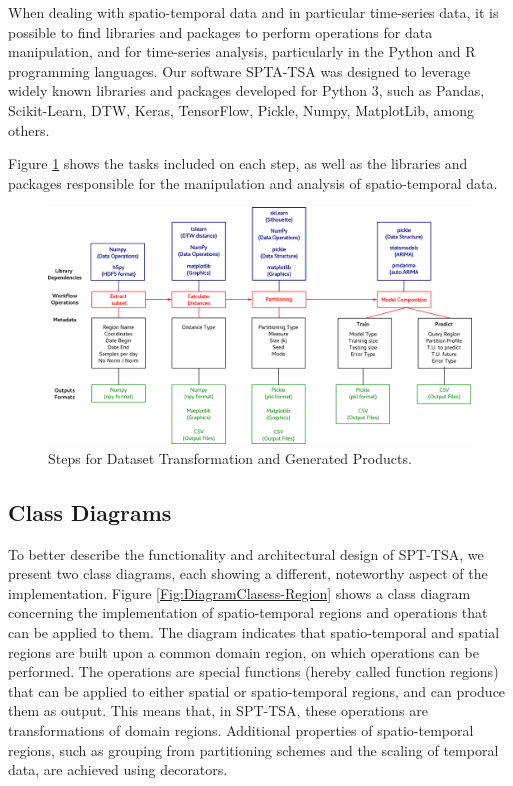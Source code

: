 When dealing with spatio-temporal data and in particular time-series data, it is possible to find libraries and packages to perform operations for data manipulation, and for time-series analysis, particularly in the Python and R programming languages. Our software SPTA-TSA was designed to leverage widely known libraries and packages developed for Python 3, such as Pandas, Scikit-Learn, DTW, Keras, TensorFlow, Pickle, Numpy, MatplotLib, among others.

Figure \ref{Fig:Steps-Data-Transformation} shows the tasks included on each step, as well as the libraries and packages responsible for the manipulation and analysis of spatio-temporal data.


\begin{figure}[tp]
	\centering
	\includegraphics[scale=0.25, angle=90]{../Figures/workflow_data_operations}
	\caption{Steps for Dataset Transformation and Generated Products.}	
	\label{Fig:Steps-Data-Transformation}	 		
\end{figure}


\subsection{Class Diagrams}
\label{Sec:SPT-TSAClassDiagrams}

To better describe the functionality and architectural design of SPT-TSA, we present two class diagrams, each showing a different, noteworthy aspect of the implementation. Figure \ref{Fig:DiagramClasess-Region} shows a class diagram concerning the implementation of spatio-temporal regions and operations that can be applied to them. The diagram indicates that spatio-temporal and spatial regions are built upon a common domain region, on which operations can be performed. The operations are special functions (hereby called function regions) that can be applied to either spatial or spatio-temporal regions, and can produce them as output. This means that, in SPT-TSA, these operations are transformations of domain regions. Additional properties of spatio-temporal regions, such as grouping from partitioning schemes and the scaling of temporal data, are achieved using decorators.

